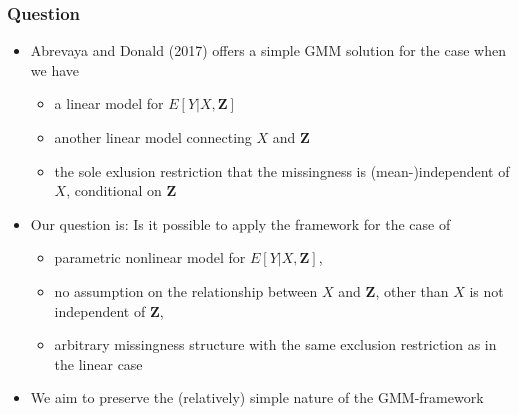 \documentclass[compress,mathserif]{beamer}
\begin{document}
\begin{frame}\frametitle{Question}\hypertarget{Question}{}
\begin{itemize}
\item Abrevaya and Donald (2017) offers a simple GMM solution for the case when we have
\begin{itemize}
\item a linear model for $E[Y|X,\mathbf{Z}]$

\item another linear model connecting $X$ and $\mathbf{Z}$

\item the sole exlusion restriction that the missingness is (mean-)independent of $X$, conditional on $\mathbf{Z}$
\end{itemize}

\item Our question is: Is it possible to apply the framework for the case of
\begin{itemize}
\item parametric nonlinear model for $E[Y|X,\mathbf{Z}]$,
\item no assumption on the relationship between $X$ and $\mathbf{Z}$, other than $X$ is not independent of $\mathbf{Z}$,
\item arbitrary missingness structure with the same exclusion restriction as in the linear case
\end{itemize}

\item We aim to preserve the (relatively) simple nature of the GMM-framework


\end{itemize}
\end{frame}
\end{document}
